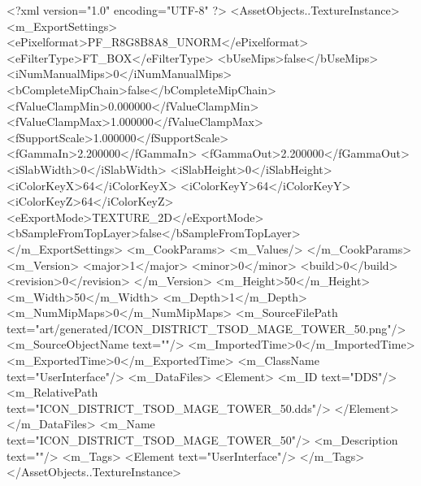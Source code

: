<?xml version="1.0" encoding="UTF-8" ?>
<AssetObjects..TextureInstance>
	<m_ExportSettings>
		<ePixelformat>PF_R8G8B8A8_UNORM</ePixelformat>
		<eFilterType>FT_BOX</eFilterType>
		<bUseMips>false</bUseMips>
		<iNumManualMips>0</iNumManualMips>
		<bCompleteMipChain>false</bCompleteMipChain>
		<fValueClampMin>0.000000</fValueClampMin>
		<fValueClampMax>1.000000</fValueClampMax>
		<fSupportScale>1.000000</fSupportScale>
		<fGammaIn>2.200000</fGammaIn>
		<fGammaOut>2.200000</fGammaOut>
		<iSlabWidth>0</iSlabWidth>
		<iSlabHeight>0</iSlabHeight>
		<iColorKeyX>64</iColorKeyX>
		<iColorKeyY>64</iColorKeyY>
		<iColorKeyZ>64</iColorKeyZ>
		<eExportMode>TEXTURE_2D</eExportMode>
		<bSampleFromTopLayer>false</bSampleFromTopLayer>
	</m_ExportSettings>
	<m_CookParams>
		<m_Values/>
	</m_CookParams>
	<m_Version>
		<major>1</major>
		<minor>0</minor>
		<build>0</build>
		<revision>0</revision>
	</m_Version>
	<m_Height>50</m_Height>
	<m_Width>50</m_Width>
	<m_Depth>1</m_Depth>
	<m_NumMipMaps>0</m_NumMipMaps>
	<m_SourceFilePath text="art/generated/ICON_DISTRICT_TSOD_MAGE_TOWER_50.png"/>
	<m_SourceObjectName text=""/>
	<m_ImportedTime>0</m_ImportedTime>
	<m_ExportedTime>0</m_ExportedTime>
	<m_ClassName text="UserInterface"/>
	<m_DataFiles>
		<Element>
			<m_ID text="DDS"/>
			<m_RelativePath text="ICON_DISTRICT_TSOD_MAGE_TOWER_50.dds"/>
		</Element>
	</m_DataFiles>
	<m_Name text="ICON_DISTRICT_TSOD_MAGE_TOWER_50"/>
	<m_Description text=""/>
	<m_Tags>
		<Element text="UserInterface"/>
	</m_Tags>
</AssetObjects..TextureInstance>
